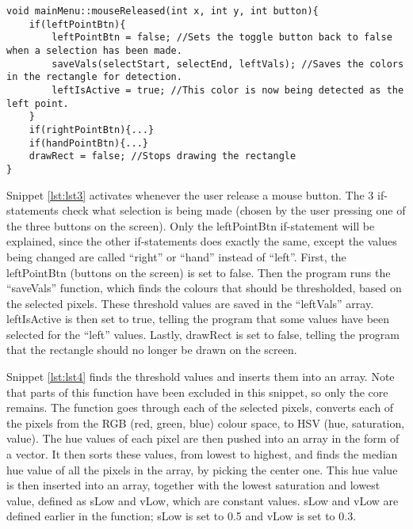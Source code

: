 \pagebreak[4]
\begin{lstlisting}[caption=mouseReleased function, label=lst:lst3]
void mainMenu::mouseReleased(int x, int y, int button){
    if(leftPointBtn){
        leftPointBtn = false; //Sets the toggle button back to false when a selection has been made.
        saveVals(selectStart, selectEnd, leftVals); //Saves the colors in the rectangle for detection.
        leftIsActive = true; //This color is now being detected as the left point.
    }
    if(rightPointBtn){...}
    if(handPointBtn){...}
    drawRect = false; //Stops drawing the rectangle
}
\end{lstlisting}

Snippet \ref{lst:lst3} activates whenever the user release a mouse button.
The 3 if-statements check what selection is being made (chosen by the user pressing one of the three buttons on the screen). 
Only the leftPointBtn if-statement will be explained, since the other if-statements does exactly the same, except the values being changed are called “right” or “hand” instead of “left”. 
First, the leftPointBtn (buttons on the screen) is set to false. Then the program runs the “saveVals” function, which finds the colours that should be thresholded, based on the selected pixels. 
These threshold values are saved in the “leftVals” array.
leftIsActive is then set to true, telling the program that some values have been selected for the “left” values.
Lastly, drawRect is set to false, telling the program that the rectangle should no longer be drawn on the screen.
\bigskip

Snippet \ref{lst:lst4} finds the threshold values and inserts them into an array. 
Note that parts of this function have been excluded in this snippet, so only the core remains. 
The function goes through each of the selected pixels, converts each of the pixels from the RGB (red, green, blue) colour space, to HSV (hue, saturation, value). 
The hue values of each pixel are then pushed into an array in the form of a vector. 
It then sorts these values, from lowest to highest, and finds the median hue value of all the pixels in the array, by picking the center one. 
This hue value is then inserted into an array, together with the lowest saturation and lowest value, defined as sLow and vLow, which are constant values. 
sLow and vLow are defined earlier in the function; sLow is set to 0.5 and vLow is set to 0.3.

